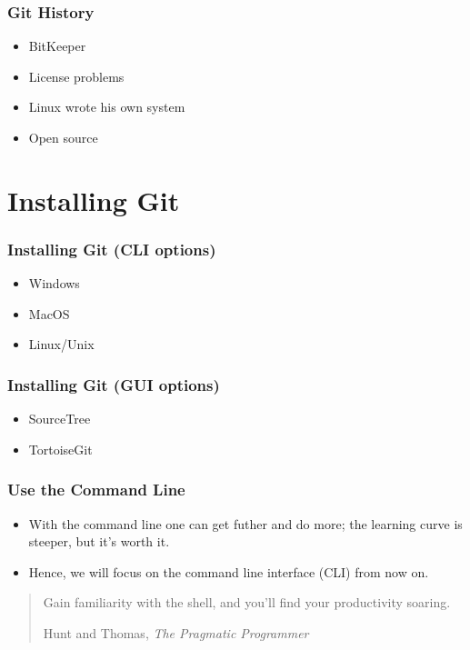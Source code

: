 \documentclass{git_course}
\begin{document}
\begin{frame}
\frametitle{Git History}
\begin{itemize}
    \item BitKeeper
    \item License problems
    \item Linux wrote his own system
    \item Open source
\end{itemize}
\end{frame}


\section{Installing Git}

\begin{frame}
\frametitle{Installing Git (CLI options)}
\begin{itemize}
    \item Windows
    \item MacOS
    \item Linux/Unix
\end{itemize}
\end{frame}

\begin{frame}
\frametitle{Installing Git (GUI options)}
\begin{itemize}
    \item SourceTree
    \item TortoiseGit
\end{itemize}
\end{frame}

\begin{frame}
\frametitle{Use the Command Line}
\begin{itemize}
    \item With the command line one can get futher and do more; the
        learning curve is steeper, but it's worth it.
    \item Hence, we will focus on the command line interface (CLI) from now
        on.
\end{itemize}
    \blockquote[Hunt and Thomas, \emph{The Pragmatic Programmer}]
    {Gain familiarity with the shell, and you'll find your productivity soaring.}
\end{frame}
\end{document}
